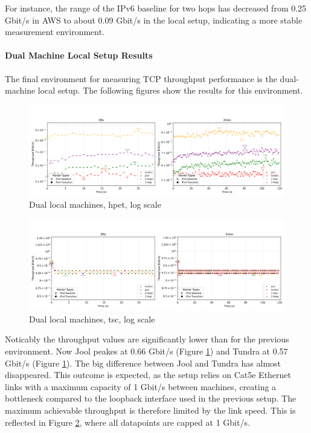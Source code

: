 For instance, the range of the IPv6 baseline for two hops has decreased from 0.25 Gbit/s in AWS to about 0.09 Gbit/s in the local setup, indicating a more stable measurement environment.

\paragraph{Dual Machine Local Setup Results}
The final environment for measuring TCP throughput performance is the dual-machine local setup. The following figures show the results for this environment.

\begin{figure}[H]
    \centering
    \includegraphics[width=1\textwidth]{resources/plots/CombinedPlot/TCP/Double_tcp_sameScale_hpet_log.png}
    \caption{Dual local machines, hpet, log scale}
    \label{fig:Dual_tcp_sameScale_hpet_log}
\end{figure}

\begin{figure}[H]
    \centering
    \includegraphics[width=1\textwidth]{resources/plots/CombinedPlot/TCP/Double_tcp_sameScale_tsc_log.png}
    \caption{Dual local machines, tsc, log scale}
    \label{fig:Dual_tcp_sameScale_tsc_log}
\end{figure}

Noticably the throughput values are significantly lower than for the previous environment. Now Jool peakes at 0.66 Gbit/s (Figure \ref{fig:Dual_tcp_sameScale_hpet_log}) and 
Tundra at 0.57 Gbit/s (Figure \ref{fig:Dual_tcp_sameScale_hpet_log}). The big difference between Jool and Tundra has almost disappeared.
This outcome is expected, as the setup relies on Cat5e Ethernet links with a maximum capacity of 1 Gbit/s between machines, creating a bottleneck compared to the loopback interface used in the previous setup.
The maximum achievable throughput is therefore limited by the link speed. This is reflected in Figure \ref{fig:Dual_tcp_sameScale_tsc_log}, where all datapoints are capped at 1 Gbit/s.


